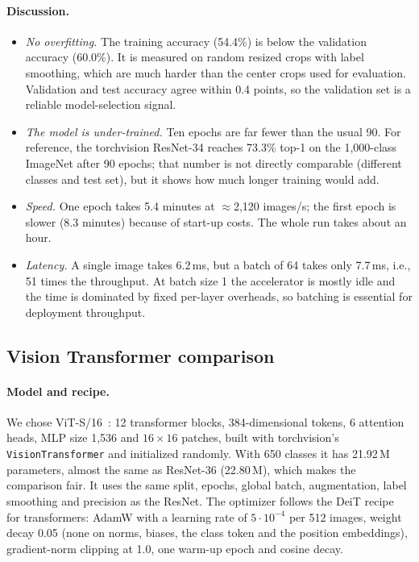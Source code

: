 \paragraph{Discussion.}
\begin{itemize}[nosep,leftmargin=*]
  \item \emph{No overfitting.} The training accuracy (54.4\%) is below the validation accuracy (60.0\%). It is measured on random resized crops with label smoothing, which are much harder than the center crops used for evaluation. Validation and test accuracy agree within 0.4 points, so the validation set is a reliable model-selection signal.
  \item \emph{The model is under-trained.} Ten epochs are far fewer than the usual 90. For reference, the torchvision ResNet-34 reaches 73.3\% top-1 on the 1{,}000-class ImageNet after 90 epochs; that number is not directly comparable (different classes and test set), but it shows how much longer training would add.
  \item \emph{Speed.} One epoch takes 5.4 minutes at $\approx$2{,}120 images/s; the first epoch is slower (8.3 minutes) because of start-up costs. The whole run takes about an hour.
  \item \emph{Latency.} A single image takes 6.2\,ms, but a batch of 64 takes only 7.7\,ms, i.e., 51 times the throughput. At batch size 1 the accelerator is mostly idle and the time is dominated by fixed per-layer overheads, so batching is essential for deployment throughput.
\end{itemize}

\subsection{Vision Transformer comparison}
\label{sec:p3-vit}

\paragraph{Model and recipe.}
We chose ViT-S/16~\cite{dosovitskiy2021vit,touvron2021deit}: 12 transformer blocks, 384-dimensional tokens, 6 attention heads, MLP size 1{,}536 and $16\times16$ patches, built with torchvision's \texttt{VisionTransformer} and initialized randomly.
With 650 classes it has 21.92\,M parameters, almost the same as ResNet-36 (22.80\,M), which makes the comparison fair.
It uses the same split, epochs, global batch, augmentation, label smoothing and precision as the ResNet.
The optimizer follows the DeiT recipe~\cite{touvron2021deit} for transformers: AdamW with a learning rate of $5\cdot10^{-4}$ per 512 images, weight decay 0.05 (none on norms, biases, the class token and the position embeddings), gradient-norm clipping at 1.0, one warm-up epoch and cosine decay.

